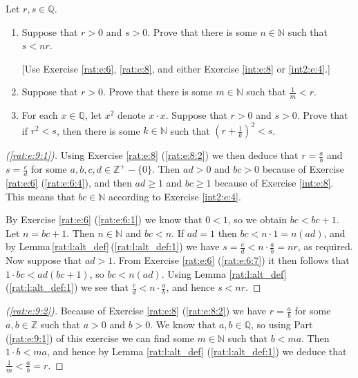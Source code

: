 \Newpage
\begin{exercise} %
	\label{rat:e:9}
	Let $r, s \in \mathbb{Q}$.
	\begin{enumerate}
		\item \label{rat:e:9:1}
		      Suppose that $r > 0$ and $s > 0$. Prove that there is some $n \in \mathbb{N}$ such that $s < n r$.

		      \hfill[Use Exercise \ref{rat:e:6}, \ref{rat:e:8}, and either Exercise \ref{int:e:8} or \ref{int2:e:4}.]
		\item \label{rat:e:9:2}
		      Suppose that $r > 0$. Prove that there is some $m \in \mathbb{N}$ such that $\frac{1}{m} < r$.
		\item \label{rat:e:9:3}
		      For each $x \in \mathbb{Q}$, let $x^{2}$ denote $x \cdot x$. Suppose that $r > 0$ and $s > 0$. Prove that if $r^{2} < s$, then there is some $k \in \mathbb{N}$ such that $\left( r + \frac{1}{k} \right)^{2} < s$.
	\end{enumerate}
\end{exercise}

\begin{proof}[(\ref{rat:e:9:1})]
	Using Exercise \ref{rat:e:8} (\ref{rat:e:8:2}) we then deduce that $r = \frac{a}{b}$ and $s = \frac{c}{d}$ for some ${a, b, c, d \in \mathbb{Z}^{+} - \{ 0 \}}$. Then $a d > 0$ and $b c > 0$ because of Exercise \ref{rat:e:6} (\ref{rat:e:6:4}), and then $a d \geq 1$ and $b c \geq 1$ because of Exercise \ref{int:e:8}. This means that $b c \in \mathbb{N}$ according to Exercise \ref{int2:e:4}.

	By Exercise \ref{rat:e:6} (\ref{rat:e:6:1}) we know that $0 < 1$, so we obtain $b c < b c + 1$. Let $n = b c + 1$. Then $n \in \mathbb{N}$ and $b c < n$. If $a d = 1$ then $b c < n \cdot 1 = n (a d)$, and by Lemma\,\ref{rat:l:alt_def}\,(\ref{rat:l:alt_def:1}) we have $s = \frac{c}{d} < n \cdot \frac{a}{b} = n r$, as required. Now suppose that $a d > 1$. From Exercise \ref{rat:e:6} (\ref{rat:e:6:7}) it then follows that $1 \cdot b c < a d (b c + 1)$, so $b c < n (a d)$. Using Lemma \ref{rat:l:alt_def} (\ref{rat:l:alt_def:1}) we see that $\frac{c}{d} < n \cdot \frac{a}{b}$, and hence $s < n r$.
\end{proof}

\begin{proof}[(\ref{rat:e:9:2})]
	Because of Exercise \ref{rat:e:8} (\ref{rat:e:8:2}) we have $r = \frac{a}{b}$ for some $a, b \in \mathbb{Z}$ such that $a > 0$ and $b > 0$. We know that $a, b \in \mathbb{Q}$, so using Part (\ref{rat:e:9:1}) of this exercise we can find some $m \in \mathbb{N}$ such that $b < m a$. Then $1 \cdot b < m a$, and hence by Lemma \ref{rat:l:alt_def} (\ref{rat:l:alt_def:1}) we deduce that $\frac{1}{m} < \frac{a}{b} = r$.
\end{proof}

